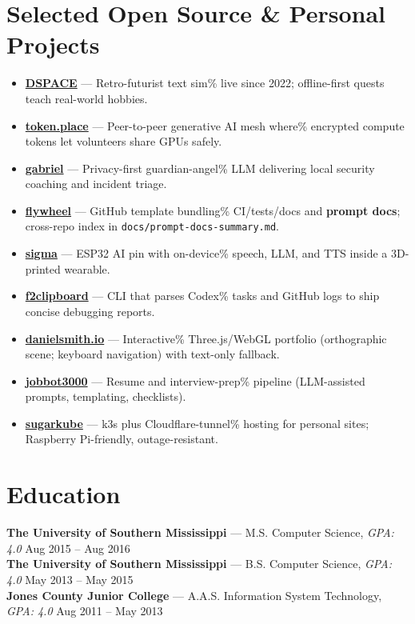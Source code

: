 \documentclass[10pt]{article}
\begin{document}
\vspace{-2mm}
\section*{Selected Open Source \& Personal Projects}
\begin{itemize}
  \item \textbf{\href{https://github.com/democratizedspace/dspace/tree/v3}{DSPACE}} — Retro-futurist text sim\%
live since 2022; offline-first quests teach real-world hobbies.
  \item \textbf{\href{https://token.place}{token.place}} — Peer-to-peer generative AI mesh where\%
encrypted compute tokens let volunteers share GPUs safely.
  \item \textbf{\href{https://github.com/futuroptimist/gabriel}{gabriel}} — Privacy-first guardian-angel\%
LLM delivering local security coaching and incident triage.
  \item \textbf{\href{https://github.com/futuroptimist/flywheel}{flywheel}} — GitHub template bundling\%
CI/tests/docs and \textbf{prompt docs}; cross-repo index in \texttt{docs/prompt-docs-summary.md}.
  \item \textbf{\href{https://github.com/futuroptimist/sigma}{sigma}} — ESP32 AI pin with on-device\%
speech, LLM, and TTS inside a 3D-printed wearable.
  \item \textbf{\href{https://github.com/futuroptimist/f2clipboard}{f2clipboard}} — CLI that parses Codex\%
tasks and GitHub logs to ship concise debugging reports.
  \item \textbf{\href{https://github.com/futuroptimist/danielsmith.io}{danielsmith.io}} — Interactive\%
Three.js/WebGL portfolio (orthographic scene; keyboard navigation) with text-only fallback.
  \item \textbf{\href{https://github.com/futuroptimist/jobbot3000}{jobbot3000}} — Resume and interview-prep\%
pipeline (LLM-assisted prompts, templating, checklists).
  \item \textbf{\href{https://github.com/futuroptimist/sugarkube}{sugarkube}} — k3s plus Cloudflare-tunnel\%
hosting for personal sites; Raspberry Pi-friendly, outage-resistant.
\end{itemize}

\vspace{-2mm}
\section*{Education}
\textbf{The University of Southern Mississippi} — M.S. Computer Science, \textit{GPA: 4.0} \hfill Aug 2015 -- Aug 2016 \\
\textbf{The University of Southern Mississippi} — B.S. Computer Science, \textit{GPA: 4.0} \hfill May 2013 -- May 2015 \\
\textbf{Jones County Junior College} — A.A.S. Information System Technology, \textit{GPA: 4.0} \hfill Aug 2011 -- May 2013
\end{document}
